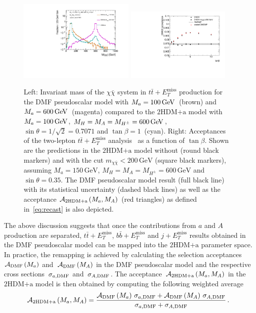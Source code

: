 \documentclass[review]{elsarticle}
\newcommand{\MET}{\ensuremath{E_T^\mathrm{miss}}\xspace}
\newcommand{\mA}{\ensuremath{M_{A}}\xspace}
\newcommand{\ma}{\ensuremath{M_{a}}\xspace}
\newcommand{\mH}{\ensuremath{M_{H}}\xspace}
\newcommand{\mHc}{\ensuremath{M_{H^{\pm}}}\xspace}
\newcommand{\hdma}{\ensuremath{\textrm{2HDM+a}}\xspace}
\begin{document}
\begin{figure}[t!]
\centering
\includegraphics[width=0.5\textwidth]{mchichi.pdf}
\includegraphics[width=0.45\textwidth]{plotacc_tb.pdf}
\vspace{2mm}
\caption{ \label{fig:mchichi_DMsimpV2HDMa}
Left: Invariant mass of the $\chi\bar{\chi}$ system in $t \bar t + \MET$ production for the DMF pseudoscalar model with $\ma =100 \, {\rm  GeV}$~(brown) and $\ma =600 \, {\rm  GeV}$~(magenta) compared to the \hdma model with $\ma = 100 \, {\rm  GeV}$, $\mH = \mA = \mHc = 600 \, {\rm  GeV}$, $\sin\theta=1/\sqrt{2}=0.7071$ and $\tan\beta=1$~(cyan). Right: Acceptances of the   two-lepton $t \bar t + \MET$ analysis~\cite{Aaboud:2017rzf}  as a function of $\tan\beta$.  Shown are the predictions in the \hdma model without (round black markers) and with the cut $m_{\chi \bar \chi} <200 \, {\mathrm{GeV}}$ (square black markers), assuming $\ma = 150 \, {\mathrm{GeV}}$, $\mH= \mA = \mHc = 600 \, {\mathrm{GeV}}$ and $\sin\theta=0.35$. The DMF pseudoscalar model result (full black line) with its statistical uncertainty (dashed black lines) as well as the acceptance  ${\cal A}_{\hdma} \left (\ma, \mA \right )$ (red triangles) as defined in~\eqref{eq:recast} is also depicted.}
\end{figure}

The above discussion suggests that once the contributions from $a$ and $A$ production are separated, $t \bar t + \MET$, $b \bar b + \MET$ and $j + \MET$  results obtained in the DMF pseudoscalar model can be mapped into the $\hdma$ parameter space. In practice, the remapping is achieved by calculating the selection acceptances~${\cal A}_{\rm DMF} \left ( \ma \right )$ and~${\cal A}_{\rm DMF} \left ( \mA \right )$ in the DMF pseudoscalar model and the respective cross sections~$\sigma_{a, {\rm DMF}}$ and~$\sigma_{A, {\rm DMF}}$. The acceptance~${\cal A}_{\hdma} \left (\ma, \mA \right )$ in the \hdma model  is then obtained by computing the following weighted average
\begin{equation} \label{eq:recast}
{\cal A}_{\hdma} \left (\ma, \mA \right )=\frac{ {\cal A}_{\rm DMF} \left ( \ma \right )\, \sigma_{a, {\rm DMF}} + {\cal A}_{\rm DMF} \left ( \mA \right ) \, \sigma_{A, {\rm DMF}} }{\sigma_{a, {\rm DMF}}+\sigma_{A, {\rm DMF}}} \,.
\end{equation}
\end{document}
